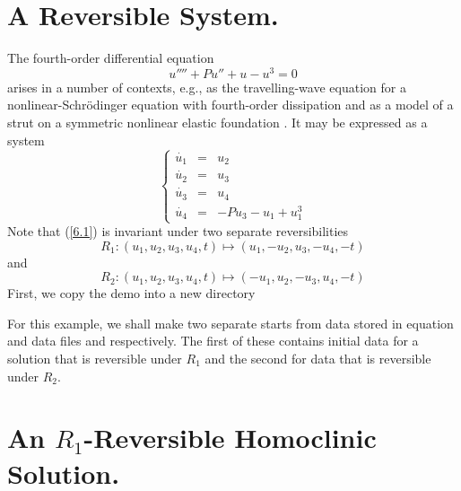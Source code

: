 \documentclass[12pt]{report}
\begin{document}
\section{ A Reversible System.}
The fourth-order differential equation
$$
u'''' + P u'' + u -u^3 =0
$$
arises in a number of contexts, e.g., as the travelling-wave
equation for a nonlinear-Schr\"{o}dinger equation with fourth-order
dissipation \cite{BuAk:95} and as a model of a strut on a symmetric 
nonlinear elastic foundation \cite{HuBoTh:89}. It may be expressed as
a system
\begin{equation}
\left \{ 
\begin{array}{rcl}
\dot{u_1} & = & u_2 \\
\dot{u_2} & = & u_3 \\
\dot{u_3} & = & u_4 \\
\dot{u_4} & = & -P u_3 - u_1 + u_1^3
\end{array}
\right.  
\label{6.1}
\end{equation}
Note that (\ref{6.1}) is invariant under two separate reversibilities
\begin{equation}
R_1: (u_1,u_2,u_3,u_4,t) \mapsto (u_1,-u_2,u_3,-u_4,-t)  
\label{6.R1}
\end{equation}
and 
\begin{equation}
R_2: (u_1,u_2,u_3,u_4,t) \mapsto (-u_1,u_2,-u_3,u_4,-t)  
\label{6.R2}
\end{equation}
First, we copy the demo into a new directory 
\begin{center}
\end{center}
For this example, we shall make two separate starts
from data stored in equation and data files  and  respectively. The first
of these contains initial data for a solution that is reversible
under $R_1$ and the second for data that is reversible under $R_2$. 
%


\section{An $R_1$-Reversible Homoclinic Solution.}
\end{document}
